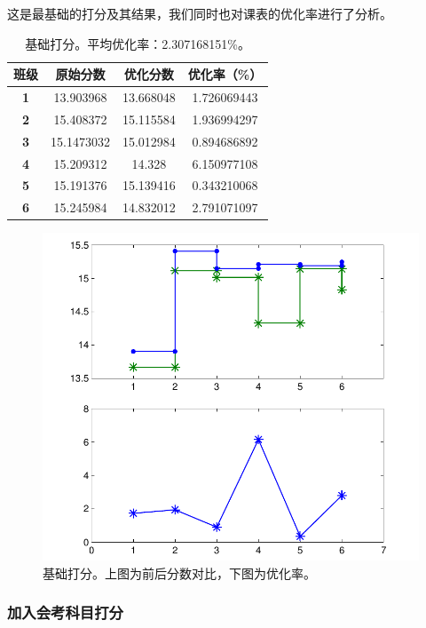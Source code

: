 \documentclass[a4paper]{article}
\begin{document}
   这是最基础的打分及其结果，我们同时也对课表的优化率进行了分析。

   \begin{table}[H]
   \centering
   \begin{tabular}{cccc}
   \toprule
   \bf 班级 & \bf 原始分数 & \bf 优化分数 & \bf 优化率（\%）\\
   \midrule
   \bf 1 & 13.903968 & 13.668048 & 1.726069443 \\
   \bf 2 & 15.408372 & 15.115584 & 1.936994297 \\
   \bf 3 & 15.1473032 & 15.012984 & 0.894686892 \\
   \bf 4 & 15.209312 & 14.328 & 6.150977108 \\
   \bf 5 & 15.191376 & 15.139416 & 0.343210068 \\
   \bf 6 & 15.245984 & 14.832012 & 2.791071097 \\
   \bottomrule
   \end{tabular}
   \caption{基础打分。平均优化率：2.307168151\%。}
   \end{table}

   \begin{figure}[H]
   \centerline{\includegraphics[scale=0.8]{mark1.pdf}}
   \caption{基础打分。上图为前后分数对比，下图为优化率。}
   \end{figure}

   \clearpage

  \subsubsection{加入会考科目打分}
\end{document}
